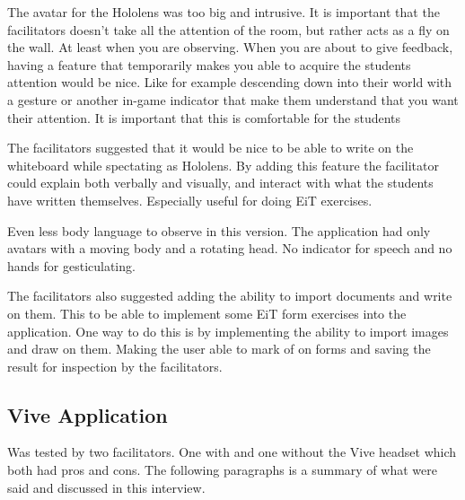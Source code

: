         The avatar for the Hololens was too big and intrusive. It is important that the facilitators doesn't take all the attention of the room, but rather acts as a fly on the wall. At least when you are observing. When you are about to give feedback, having a feature that temporarily makes you able to acquire the students attention would be nice. Like for example descending down into their world with a gesture or another in-game indicator that make them understand that you want their attention. It is important that this is comfortable for the students
        
        The facilitators suggested that it would be nice to be able to write on the whiteboard while spectating as Hololens. By adding this feature the facilitator could explain both verbally and visually, and interact with what the students have written themselves. Especially useful for doing EiT exercises.
        
        Even less body language to observe in this version. The application had only avatars with a moving body and a rotating head. No indicator for speech and no hands for gesticulating.
        
        The facilitators also suggested adding the ability to import documents and write on them. This to be able to implement some EiT form exercises into the application. One way to do this is by implementing the ability to import images and draw on them. Making the user able to mark of on forms and saving the result for inspection by the facilitators.
        
        \subsection{Vive Application} %
        Was tested by two facilitators. One with and one without the Vive headset which both had pros and cons. The following paragraphs is a summary of what were said and discussed in this interview.
        
